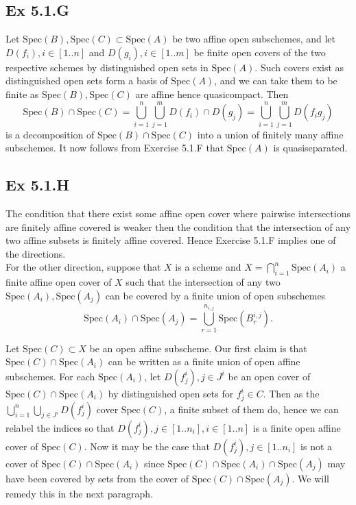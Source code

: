 \documentclass{article}
\theoremstyle{definition}
\newcommand{\Spec}{\text{Spec}}
\begin{document}
\subsection*{Ex 5.1.G}

Let $\Spec(B), \Spec(C) \subset \Spec(A)$ be two affine open subschemes, and
let $D(f_i), i \in [1..n]$ and $D(g_i), i \in [1..m]$ be finite open covers of
the two respective schemes by distinguished open sets in $\Spec(A)$. Such
covers exist as distinguished open sets form a basis of $\Spec(A)$, and we can
take them to be finite as $\Spec(B), \Spec(C)$ are affine hence quasicompact.
Then
\[
	\Spec(B) \cap \Spec(C)
	=
	\bigcup_{i = 1}^{n}
	\bigcup_{j = 1}^{m}
	D(f_i) \cap D(g_j)
	=
	\bigcup_{i = 1}^{n}
	\bigcup_{j = 1}^{m}
	D(f_ig_j)
\] 
is a decomposition of $\Spec(B) \cap \Spec(C)$ into a union of finitely many
affine subschemes. It now follows from Exercise 5.1.F that $\Spec(A)$ is
quasiseparated.

\subsection*{Ex 5.1.H}

The condition that there exist some affine open cover where pairwise
intersections are finitely affine covered is weaker then the condition that the
intersection of any two affine subsets is finitely affine covered. Hence
Exercise 5.1.F implies one of the directions. \\

For the other direction, suppose that $X$ is a scheme and $X = \bigcap_{i =
1}^{n} \Spec(A_i)$ a finite affine open cover of $X$ such that the intersection
of any two $\Spec(A_i), \Spec(A_j)$ can be covered by a finite union of open
subschemes
\[
	\Spec(A_i) \cap \Spec(A_j)
	=
	\bigcup_{r = 1}^{n_{i,j}} \Spec(B_{r}^{i, j}).
\]

Let $\Spec(C) \subset X$ be an open affine subscheme. Our first claim is that
$\Spec(C) \cap \Spec(A_i)$ can be written as a finite union of open affine
subschemes. For each $\Spec(A_i)$, let $D(f_j^i), j \in J^{i}$ be an open cover
of $\Spec(C) \cap \Spec(A_i)$ by distinguished open sets for $f_{j}^{i} \in C$.
Then as the $\bigcup_{i = 1}^{n}\bigcup_{j \in J^i} D(f_j^i)$ cover $\Spec(C)$,
a finite subset of them do, hence we can relabel the indices so that $D(f_j^i),
j \in [1.. n_i], i \in [1..n]$ is a finite open affine cover of $\Spec(C)$. Now
it may be the case that $D(f_j^i), j \in [1.. n_i]$ is not a cover of $\Spec(C)
\cap \Spec(A_i)$ since $\Spec(C) \cap \Spec(A_i) \cap \Spec(A_j)$ may have been
covered by sets from the cover of $\Spec(C) \cap \Spec(A_j)$. We will remedy
this in the next paragraph. \\
\end{document}

